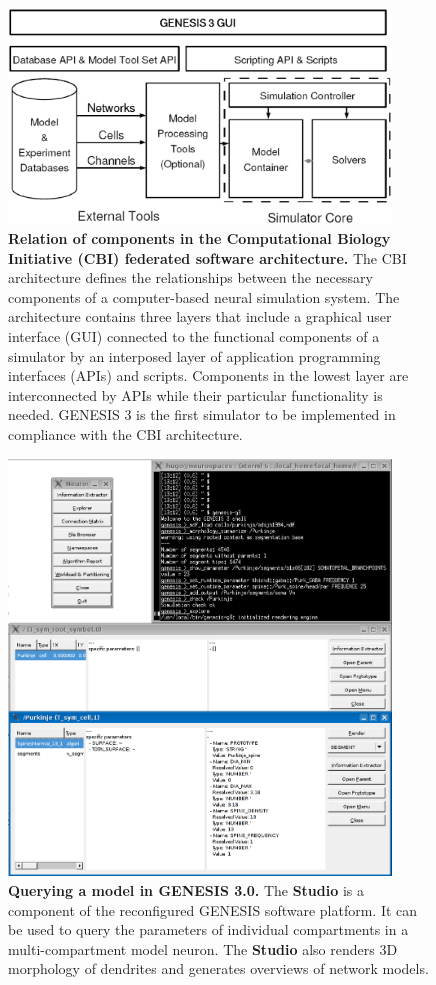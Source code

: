 \documentclass[10pt]{article}
\begin{document}
\begin{figure}[ht]
\begin{center}
\includegraphics[width=4in]{figures/G3arch.eps}
\end{center}
\caption{
{\bf Relation of components in the Computational Biology Initiative (CBI) federated software architecture.} The CBI architecture defines the relationships between the necessary components of a computer-based neural simulation system. The architecture contains three layers that include a graphical user interface (GUI) connected to the functional components of a simulator by an interposed layer of application programming interfaces (APIs) and scripts. Components in the lowest layer are interconnected by APIs while their particular functionality is needed. GENESIS 3 is the first simulator to be implemented in compliance with the CBI architecture.
}
\label{fig:cbi-arch}
\end{figure}

\clearpage

\begin{figure}[ht]
\begin{center}
\includegraphics[width=4in]{figures/studio-screenshot.eps}
\end{center}
\caption{
{\bf Querying a model in GENESIS 3.0.} The {\bf Studio} is a component of the reconfigured GENESIS software platform. It can be used to query the parameters of individual compartments in a multi-compartment model neuron. The {\bf Studio} also renders 3D morphology of dendrites and generates overviews of network models.
}
\label{fig:cbi-studio}
\end{figure}
\end{document}
